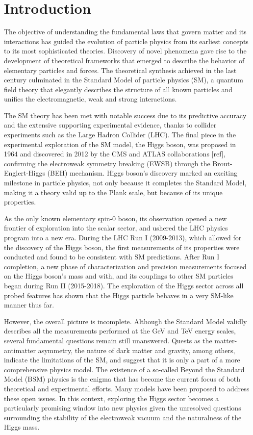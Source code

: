 \chapter*{Introduction}
%
\noindent
%

\noindent The objective of understanding the fundamental laws that govern matter and its interactions has guided the evolution of particle physics from its earliest concepts to its most sophisticated theories. Discovery of novel phenomena gave rise to the development of theoretical frameworks that emerged to describe the behavior of elementary particles and forces. The theoretical synthesis achieved in the last century culminated in the Standard Model of particle physics (SM), a quantum field theory that elegantly describes the structure of all known particles and unifies the electromagnetic, weak and strong interactions. 

The SM theory has been met with notable success due to its predictive accuracy and the extensive supporting experimental evidence, thanks to collider experiments such as the Large Hadron Collider (LHC). The final piece in the experimental exploration of the SM model, the Higgs boson, was proposed in 1964 and discovered in 2012 by the CMS and ATLAS collaborations [ref], confirming the electroweak symmetry breaking (EWSB) through the Brout-Englert-Higgs (BEH) mechanism. Higgs boson's discovery marked an exciting milestone in particle physics, not only because it completes the Standard Model, making it a theory valid up to the Plank scale, but because of its unique properties.

As the only known elementary spin-0 boson, its observation opened a new frontier of exploration into the scalar sector, and ushered the LHC physics program into a new era. During the LHC Run I (2009-2013), which allowed for the discovery of the Higgs boson, the first measurements of its properties were conducted and found to be consistent with SM predictions. After Run I completion, a new phase of characterization and precision measurements focused on the Higgs boson's mass and with, and its couplings to other SM particles began during Run II (2015-2018). The exploration of the Higgs sector across all probed features has shown that the Higgs particle behaves in a very SM-like manner thus far.

However, the overall picture is incomplete. Although the Standard Model validly describes all the measurements performed at the GeV and TeV energy scales, several fundamental questions remain still unanswered. Quests as the matter-antimatter asymmetry, the nature of dark matter and gravity, among others, indicate the limitations of the SM, and suggest that it is only a part of a more comprehensive physics model. The existence of a so-called Beyond the Standard Model (BSM) physics is the enigma that has become the current focus of both theoretical and experimental efforts. Many models have been proposed to address these open issues. In this context, exploring the Higgs sector becomes a particularly promising window into new physics given the unresolved questions surrounding the stability of the electroweak vacuum and the naturalness of the Higgs mass. 

